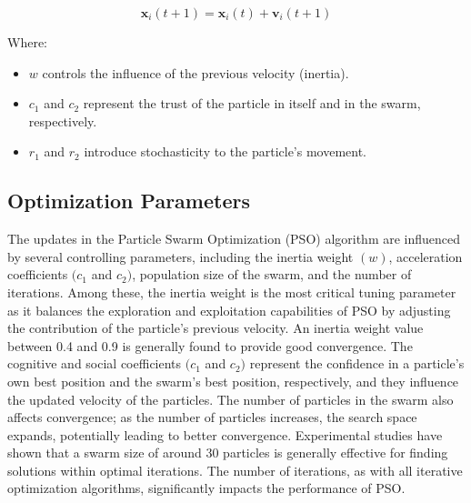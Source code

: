 \documentclass[paper,revised]{geophysics}
\begin{document}
\begin{equation}	
	\mathbf{x}_i(t+1) = \mathbf{x}_i(t) + \mathbf{v}_i(t+1)	
	\label{eqn:pso_2}
\end{equation}

Where:
\begin{itemize}
	\item \( w \) controls the influence of the previous velocity (inertia).
	\item \( c_1 \) and \( c_2 \) represent the trust of the particle in itself and in the swarm, respectively.
	\item \( r_1 \) and \( r_2 \) introduce stochasticity to the particle's movement.
\end{itemize}
\subsection{Optimization Parameters}
The updates in the Particle Swarm Optimization (PSO) algorithm are influenced by several controlling parameters, including the inertia weight \((w)\), acceleration coefficients \((c_1\) and \(c_2)\), population size of the swarm, and the number of iterations. Among these, the inertia weight is the most critical tuning parameter as it balances the exploration and exploitation capabilities of PSO by adjusting the contribution of the particle's previous velocity. An inertia weight value between 0.4 and 0.9 is generally found to provide good convergence. The cognitive and social coefficients \((c_1\) and \(c_2)\) represent the confidence in a particle's own best position and the swarm's best position, respectively, and they influence the updated velocity of the particles. The number of particles in the swarm also affects convergence; as the number of particles increases, the search space expands, potentially leading to better convergence. Experimental studies have shown that a swarm size of around 30 particles is generally effective for finding solutions within optimal iterations. The number of iterations, as with all iterative optimization algorithms, significantly impacts the performance of PSO.
\\
\end{document}
